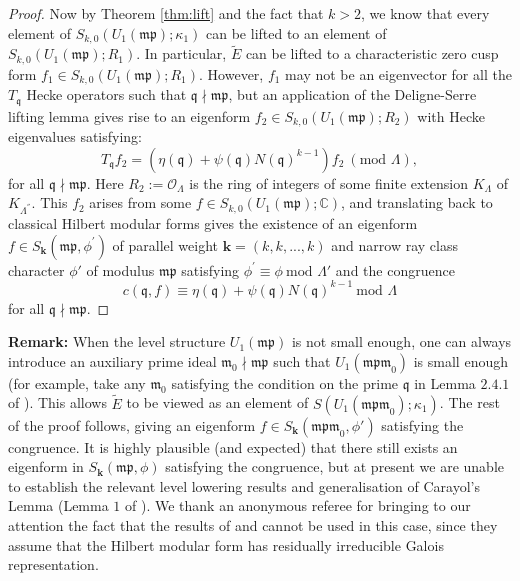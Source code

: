 \documentclass[a4paper,oneside]{amsart}
\theoremstyle{plain}
\theoremstyle{definition}
\begin{document}
\begin{proof}
Now by Theorem \ref{thm:lift} and the fact that $k>2$, we know that every element of $S_{k,0}(U_1(\mathfrak{mp});\kappa_1)$ can be lifted to an element of $S_{k,0}(U_1(\mathfrak{mp});R_1)$. In particular, $\tilde{E}$ can be lifted to a characteristic zero cusp form $f_1 \in S_{k,0}(U_1(\mathfrak{mp});R_1)$. However, $f_1$ may not be an eigenvector for all the $T_\mathfrak{q}$ Hecke operators such that $\mathfrak{q} \nmid \mathfrak{mp}$, but an application of the Deligne-Serre lifting lemma \cite[Lemma 6.11]{deligneserre} gives rise to an eigenform $f_2 \in S_{k,0}(U_1(\mathfrak{mp});R_2)$ with Hecke eigenvalues satisfying:
\begin{equation*}
    T_{\mathfrak{q}}f_2 = (\eta(\mathfrak{q}) + \psi(\mathfrak{q})N(\mathfrak{q})^{k-1})f_2 \ (\text{mod } \Lambda),
\end{equation*}
for all $\mathfrak{q} \nmid \mathfrak{mp}$. Here $R_2:= \mathcal{O}_{\Lambda}$ is the ring of integers of some finite extension $K_{\Lambda}$ of $K_{\Lambda^{''}}$. This $f_2$ arises from some $f \in S_{k,0}(U_1(\mathfrak{mp});\mathbb{C})$, and translating back to classical Hilbert modular forms gives the existence of an eigenform $f \in S_{\textbf{k}}(\mathfrak{mp}, \phi^\prime)$ of parallel weight $\textbf{k} = (k,k,...,k)$ and narrow ray class character $\phi'$ of modulus $\mathfrak{mp}$ satisfying $\phi^\prime \equiv \phi \ \text{mod } \Lambda'$ and the congruence
\begin{equation*}
    c(\mathfrak{q}, f) \equiv \eta(\mathfrak{q}) + \psi(\mathfrak{q})N(\mathfrak{q})^{k-1} \ \text{mod } \Lambda
\end{equation*}
for all $\mathfrak{q} \nmid \mathfrak{mp}$. 
\end{proof}


\noindent \textbf{Remark:} When the level structure $U_1(\mathfrak{mp})$ is not small enough, one can always introduce an auxiliary prime ideal $\mathfrak{m}_0\nmid \mathfrak{mp}$ such that $U_1(\mathfrak{mpm}_0)$ is small enough (for example, take any $\mathfrak{m}_0$ satisfying the condition on the prime $\mathfrak{q}$ in Lemma $2.4.1$ of \cite{diamondsasaki}). This allows $\tilde{E}$ to be viewed as an element of $S(U_1(\mathfrak{mpm}_0);\kappa_1)$. The rest of the proof follows, giving an eigenform $f\in S_{\textbf{k}}(\mathfrak{mpm}_0,\phi')$ satisfying the congruence. It is highly plausible (and expected) that there still exists an eigenform in $S_{\textbf{k}}(\mathfrak{mp},\phi)$ satisfying the congruence, but at present we are unable to establish the relevant level lowering results and generalisation of Carayol's Lemma (Lemma $1$ of \cite{carayol}). We thank an anonymous referee for bringing to our attention the fact that the results of \cite{jarvis} and \cite{jarvis2} cannot be used in this case, since they assume that the Hilbert modular form has residually irreducible Galois representation.
\end{document}
